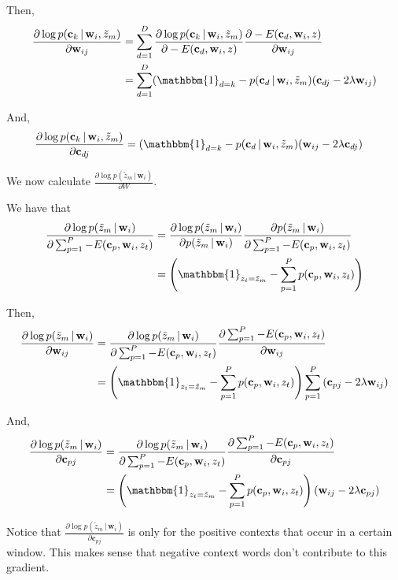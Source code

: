\documentclass{article} %
\begin{document}
Then,
\begin{align*}
\frac{\partial \log p(\mathbf{c}_k \, | \, \mathbf{w}_i , \tilde{z}_m)}{\partial \mathbf{w}_{ij}} &=
\sum_{d=1}^{D} \frac{\partial \log p(\mathbf{c}_k \, | \, \mathbf{w}_i , \tilde{z}_m)}{\partial -E(\mathbf{c}_d, \mathbf{w}_i, z)}
\frac{\partial -E(\mathbf{c}_d, \mathbf{w}_i, z)}{\partial \mathbf{w}_{ij}} \\
&= \sum_{d=1}^{D} (\mathbbm{1}_{d = k} - p(\mathbf{c}_d \, | \, \mathbf{w}_i , \tilde{z}_m) (\mathbf{c}_{dj} - 2 \lambda \mathbf{w}_{ij})
\end{align*}

And,
\begin{align*}
\frac{\partial \log p(\mathbf{c}_k \, | \, \mathbf{w}_i , \tilde{z}_m)}{\partial \mathbf{c}_{dj}} &=
(\mathbbm{1}_{d = k} - p(\mathbf{c}_d \, | \, \mathbf{w}_i , \tilde{z}_m) (\mathbf{w}_{ij} - 2 \lambda \mathbf{c}_{dj})
\end{align*}

We now calculate $\frac{\partial \log  p(\tilde{z}_m \, | \, \mathbf{w}_i)}{\partial W}$.

We have that 
\begin{align*}
\frac{\partial \log  p(\tilde{z}_m \, | \, \mathbf{w}_i)}
{\partial \sum_{p=1}^{P} -E(\mathbf{c}_p, \mathbf{w}_i, z_t)} 
&=
\frac{\partial \log  p(\tilde{z}_m \, | \, \mathbf{w}_i)}
{\partial  p(\tilde{z}_m \, | \, \mathbf{w}_i)}
\frac{\partial  p(\tilde{z}_m \, | \, \mathbf{w}_i)}
{\partial \sum_{p=1}^{P} -E(\mathbf{c}_p, \mathbf{w}_i, z_t)} \\
&= 
\left( \mathbbm{1}_{z_t = \tilde{z}_m} - \sum_{p=1}^{P} p(\mathbf{c}_p, \mathbf{w}_i, z_t) \right) \\
\end{align*}

Then,
\begin{align*}
\frac{\partial \log  p(\tilde{z}_m \, | \, \mathbf{w}_i)}{\partial \mathbf{w}_{ij}} 
&=
\frac{\partial \log  p(\tilde{z}_m \, | \, \mathbf{w}_i)}
{\partial \sum_{p=1}^{P} -E(\mathbf{c}_p, \mathbf{w}_i, z_t)}
\frac{\partial \sum_{p=1}^{P} -E(\mathbf{c}_p, \mathbf{w}_i, z_t)}{\partial \mathbf{w}_{ij}} \\
&=
\left( \mathbbm{1}_{z_t = \tilde{z}_m} - \sum_{p=1}^{P} p(\mathbf{c}_p, \mathbf{w}_i, z_t) \right)
\sum_{p=1}^{P} \left( \mathbf{c}_{pj} - 2 \lambda \mathbf{w}_{ij} \right)
\end{align*}

And,
\begin{align*}
\frac{\partial \log  p(\tilde{z}_m \, | \, \mathbf{w}_i)}{\partial \mathbf{c}_{pj}} 
&= 
\frac{\partial \log  p(\tilde{z}_m \, | \, \mathbf{w}_i)}
{\partial \sum_{p=1}^{P} -E(\mathbf{c}_p, \mathbf{w}_i, z_t)}
\frac{\partial \sum_{p=1}^{P} -E(\mathbf{c}_p, \mathbf{w}_i, z_t)}{\partial \mathbf{c}_{pj}} \\
&= 
\left( \mathbbm{1}_{z_t = \tilde{z}_m} - \sum_{p=1}^{P} p(\mathbf{c}_p, \mathbf{w}_i, z_t) \right)
\left( \mathbf{w}_{ij} - 2 \lambda \mathbf{c}_{pj} \right)
\end{align*}

Notice that $\frac{\partial \log  p(\tilde{z}_m \, | \, \mathbf{w}_i)}{\partial \mathbf{c}_{pj}} $ 
is only for the positive contexts that occur in a certain window. This makes sense that
negative context words don't contribute to this gradient.
\end{document}
